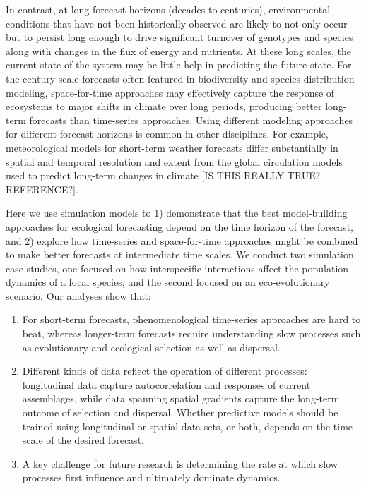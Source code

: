 \documentclass[11pt]{article}
\begin{document}
In contrast, at long forecast horizons (decades to centuries),  environmental conditions that have not been 
historically observed are likely to not only occur but to persist long enough to drive significant turnover of genotypes and species 
along with changes in the flux of energy and nutrients.  At these long scales, the current state of the system may be 
little help in predicting the future state. For the century-scale forecasts often featured in biodiversity and 
species-distribution modeling, space-for-time approaches may effectively capture the response of ecosystems to major shifts 
in climate over long periods, producing better long-term forecasts than time-series approaches. 
Using different modeling approaches for different forecast horizons is common in other disciplines.
For example, meteorological models for short-term weather forecasts differ substantially in spatial
and temporal resolution and extent from the global circulation models used to predict long-term changes
in climate [IS THIS REALLY TRUE? REFERENCE?].

Here we use simulation models to 1) demonstrate that the best model-building approaches for ecological forecasting 
depend on the time horizon of the forecast, and 2) explore how time-series and space-for-time approaches might be 
combined to make better forecasts at intermediate time scales. We conduct two simulation case studies, one 
focused on how interspecific interactions affect the population dynamics of a focal species, and the second focused on
an eco-evolutionary scenario. Our analyses show that: 
\begin{enumerate}
	\item For short-term forecasts, phenomenological time-series approaches are hard to beat, whereas longer-term forecasts require understanding slow processes such as evolutionary and ecological selection as well as dispersal.
	\item Different kinds of data reflect the operation of different processes: longitudinal data capture autocorrelation and responses of current assemblages, while data spanning spatial gradients capture the long-term outcome of selection and dispersal.  Whether predictive models should be trained using longitudinal or spatial data sets, or both, depends on the time-scale of the desired forecast.
	\item A key challenge for future research is determining the rate at which slow processes first influence and ultimately dominate dynamics.
\end{enumerate}
\end{document}

